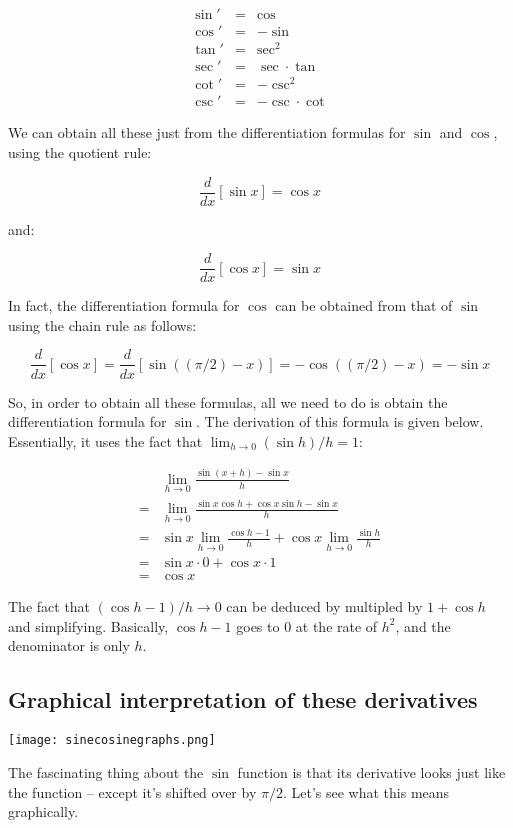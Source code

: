 \documentclass[10pt]{amsart}
\begin{document}
\begin{eqnarray*}
  \sin' & = & \cos\\
  \cos' & = & -\sin \\
  \tan' & = & \sec^2\\
  \sec' & = & \sec \cdot \tan \\
  \cot' & = & -\csc^2\\
  \csc' & = & -\csc \cdot \cot
\end{eqnarray*}

We can obtain all these just from the differentiation formulas for
$\sin$ and $\cos$, using the quotient rule:

$$\frac{d}{dx}[\sin x] = \cos x$$

and:

$$\frac{d}{dx}[\cos x] = \sin x$$

In fact, the differentiation formula for $\cos$ can be obtained from
that of $\sin$ using the chain rule as follows:

$$\frac{d}{dx}[\cos x] = \frac{d}{dx}[\sin((\pi/2) - x)] = -\cos((\pi/2) - x) = - \sin x$$

So, in order to obtain all these formulas, all we need to do is obtain
the differentiation formula for $\sin$. The derivation of this formula
is given below. Essentially, it uses the fact that $\lim_{h \to 0}
(\sin h)/h = 1$:

\begin{align*}
  & \lim_{h \to 0} \frac{\sin(x + h) - \sin x}{h} \\
  = & \lim_{h \to 0} \frac{\sin x \cos h + \cos x \sin h - \sin x}{h}\\
  = & \sin x \lim_{h \to 0} \frac{\cos h - 1}{h} + \cos x \lim_{h \to 0} \frac{\sin h}{h}\\
  = & \sin x \cdot 0 + \cos x \cdot 1 \\
  = & \cos x
\end{align*}

The fact that $(\cos h - 1)/h \to 0$ can be deduced by multipled by $1
+ \cos h$ and simplifying. Basically, $\cos h - 1$ goes to $0$ at the
rate of $h^2$, and the denominator is only $h$.

\subsection{Graphical interpretation of these derivatives}

\texttt{[image: sinecosinegraphs.png]}

The fascinating thing about the $\sin$ function is that its derivative
looks just like the function -- except it's shifted over by
$\pi/2$. Let's see what this means graphically.
\end{document}
